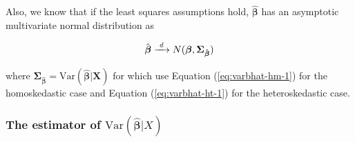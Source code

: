 \documentclass[a4paper,11pt]{article}
\newcommand{\var}{\mathrm{Var}}
\newcommand{\rarrowd}[1]{\xrightarrow{\text{ \textit #1 }}}
\begin{document}
Also, we know that if the least squares assumptions hold,
\(\hat{\boldsymbol{\beta}}\) has an asymptotic multivariate normal
distribution as

\begin{equation}
\label{eq:normal-bhat-m}
\hat{\boldsymbol{\beta}} \rarrowd{d} N(\boldsymbol{\beta}, \mathbf{\Sigma_{\hat{\boldsymbol{\beta}}}})
\end{equation}

where \(\mathbf{\Sigma_{\hat{\boldsymbol{\beta}}}} =
\var(\hat{\boldsymbol{\beta}} | \mathbf{X})\) for which use
Equation (\ref{eq:varbhat-hm-1}) for the homoskedastic case and Equation
(\ref{eq:varbhat-ht-1}) for the heteroskedastic case.


\subsubsection*{The estimator of \(\var(\hat{\boldsymbol{\beta}}|X)\)}
\label{sec:orga3581cf}
\end{document}
